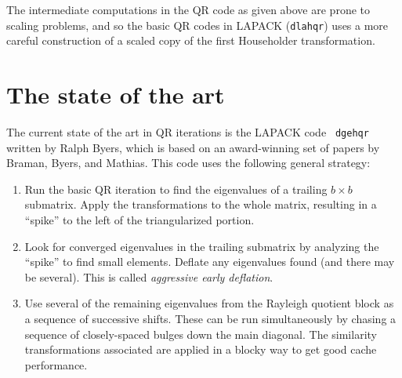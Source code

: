 \documentclass[12pt, leqno]{article} %
\begin{document}
The intermediate computations in the QR code as given above are prone to
scaling problems, and so the basic QR codes in LAPACK ({\tt dlahqr})
uses a more careful construction of a scaled copy of the first Householder
transformation.

\section{The state of the art}

The current state of the art in QR iterations is the LAPACK code {\tt
  dgehqr} written by Ralph Byers, which is based on an award-winning
set of papers by Braman, Byers, and Mathias.  This code uses the following
general strategy:
\begin{enumerate}
\item
  Run the basic QR iteration to find the eigenvalues of a trailing $b \times b$
  submatrix.  Apply the transformations to the whole matrix, resulting in
  a ``spike'' to the left of the triangularized portion.
\item
  Look for converged eigenvalues in the trailing submatrix by analyzing
  the ``spike'' to find small elements.  Deflate any eigenvalues found
  (and there may be several).  This is called {\em aggressive early deflation}.
\item
  Use several of the remaining eigenvalues from the Rayleigh quotient block
  as a sequence of successive shifts.  These can be run simultaneously by
  chasing a sequence of closely-spaced bulges down the main diagonal.
  The similarity transformations associated are applied in a blocky way
  to get good cache performance.
\end{enumerate}
\end{document}
